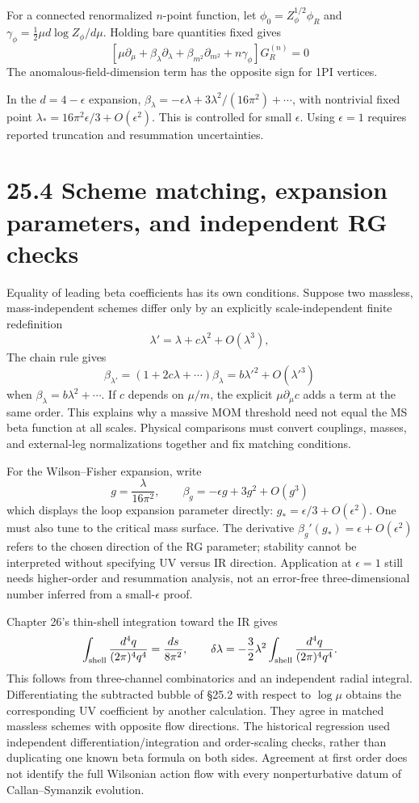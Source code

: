 \documentclass[
  11pt,
  oneside]{book}
\begin{document}
For a connected renormalized \(n\)-point function, let
\(\phi_0=Z_\phi^{1/2}\phi_R\) and
\(\gamma_\phi=\tfrac12\mu d\log Z_\phi/d\mu\). Holding bare quantities
fixed gives \[
[\mu\partial_\mu+\beta_\lambda\partial_\lambda+
\beta_{m^2}\partial_{m^2}+n\gamma_\phi]G_R^{(n)}=0
\] The anomalous-field-dimension term has the opposite sign for 1PI
vertices.

In the \(d=4-\epsilon\) expansion,
\(\beta_\lambda=-\epsilon\lambda+3\lambda^2/(16\pi^2)+\cdots\), with
nontrivial fixed point \(\lambda_*=16\pi^2\epsilon/3+O(\epsilon^2)\).
This is controlled for small \(\epsilon\). Using \(\epsilon=1\) requires
reported truncation and resummation uncertainties.

\section{25.4 Scheme matching, expansion parameters, and independent RG
checks}

Equality of leading beta coefficients has its own conditions. Suppose
two massless, mass-independent schemes differ only by an explicitly
scale-independent finite redefinition \[
\lambda'=\lambda+c\lambda^2+O(\lambda^3),
\] The chain rule gives \[
\beta_{\lambda'}=(1+2c\lambda+\cdots)\beta_\lambda
=b\lambda'^2+O(\lambda'^3)
\] when \(\beta_\lambda=b\lambda^2+\cdots\). If \(c\) depends on
\(\mu/m\), the explicit \(\mu\partial_\mu c\) adds a term at the same
order. This explains why a massive MOM threshold need not equal the MS
beta function at all scales. Physical comparisons must convert
couplings, masses, and external-leg normalizations together and fix
matching conditions.

For the Wilson--Fisher expansion, write \[
g=\frac{\lambda}{16\pi^2},\qquad
\beta_g=-\epsilon g+3g^2+O(g^3)
\] which displays the loop expansion parameter directly:
\(g_*=\epsilon/3+O(\epsilon^2)\). One must also tune to the critical
mass surface. The derivative \(\beta_g'(g_*)=\epsilon+O(\epsilon^2)\)
refers to the chosen direction of the RG parameter; stability cannot be
interpreted without specifying UV versus IR direction. Application at
\(\epsilon=1\) still needs higher-order and resummation analysis, not an
error-free three-dimensional number inferred from a small-\(\epsilon\)
proof.

Chapter 26's thin-shell integration toward the IR gives \[
\int_{\rm shell}\frac{d^4q}{(2\pi)^4q^4}=\frac{ds}{8\pi^2},
\qquad\delta\lambda=-\frac32\lambda^2\int_{\rm shell}\frac{d^4q}{(2\pi)^4q^4}.
\] This follows from three-channel combinatorics and an independent
radial integral. Differentiating the subtracted bubble of §25.2 with
respect to \(\log\mu\) obtains the corresponding UV coefficient by
another calculation. They agree in matched massless schemes with
opposite flow directions. The historical regression used independent
differentiation/integration and order-scaling checks, rather than
duplicating one known beta formula on both sides. Agreement at first
order does not identify the full Wilsonian action flow with every
nonperturbative datum of Callan--Symanzik evolution.
\end{document}
